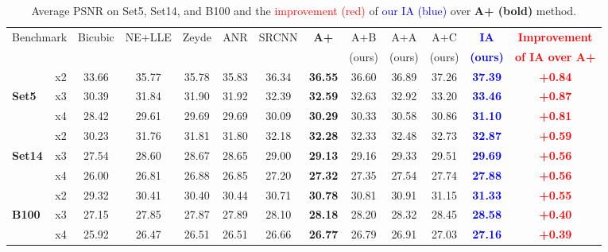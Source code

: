 \documentclass[10pt,twocolumn,letterpaper]{article}
\begin{document}
\begin{table}
\vspace{-0.2cm}
 \setlength{\tabcolsep}{4pt} 
\centering
\caption{Average PSNR on Set5, Set14, and B100 and the \textcolor{red}{improvement (red)} of \textcolor{blue}{our IA (blue)} over \textbf{A+ (bold)} method.
}
\vspace{0.01cm}
{
\begin{tabular}{lc||c c c c c c|c c c c|c}
\multicolumn{2}{c||}{Benchmark}&Bicubic&NE+LLE&Zeyde&ANR& SRCNN&\textbf{A+}&A+B&A+A&A+C&\textcolor{blue}{\bf IA}&\textcolor{red}{\bf Improvement}\\
\multicolumn{2}{c||}{ } &&\cite{Timofte-ICCV-2013}&\cite{Zeyde-CS-2012}&\cite{Timofte-ICCV-2013}& \cite{Dong-ECCV-2014}&\cite{Timofte-ACCV-2014}&(ours)&(ours)&(ours) &\textcolor{blue}{\bf (ours)}&\textcolor{red}{\bf of IA over A+}\\
\hline\hline
              & x2 & 33.66 & 35.77 & 35.78 & 35.83 & 36.34 &\textbf{36.55}&36.60&36.89&37.26&\textcolor{blue}{\bf 37.39}&\textcolor{red}{\bf +0.84}\\
\textbf{Set5 }& x3 & 30.39 & 31.84 & 31.90 & 31.92 & 32.39 &\textbf{32.59}&32.63&32.92&33.20&\textcolor{blue}{\bf 33.46}&\textcolor{red}{\bf+0.87}\\
              & x4 & 28.42 & 29.61 & 29.69 & 29.69 & 30.09 &\textbf{30.29}&30.33&30.58&30.86&\textcolor{blue}{\bf 31.10}&\textcolor{red}{\bf+0.81}\\
\hline
              & x2 & 30.23 & 31.76 & 31.81 & 31.80 & 32.18 &\textbf{32.28}&32.33&32.48&32.73&\textcolor{blue}{\bf 32.87}&\textcolor{red}{\bf+0.59}\\
\textbf{Set14}& x3 & 27.54 & 28.60 & 28.67 & 28.65 & 29.00 &\textbf{29.13}&29.16&29.33&29.51&\textcolor{blue}{\bf 29.69}&\textcolor{red}{\bf+0.56}\\
              & x4 & 26.00 & 26.81 & 26.88 & 26.85 & 27.20 &\textbf{27.32}&27.35&27.54&27.74&\textcolor{blue}{\bf 27.88}&\textcolor{red}{\bf+0.56}\\
              
\hline

             & x2 & 29.32 & 30.41 & 30.40 & 30.44 & 30.71 &\textbf{30.78}&30.81&30.91&31.15&\textcolor{blue}{\bf 31.33}&\textcolor{red}{\bf+0.55}\\
\textbf{B100}& x3 & 27.15 & 27.85 & 27.87 & 27.89 & 28.10 &\textbf{28.18}&28.20&28.32&28.45&\textcolor{blue}{\bf 28.58}&\textcolor{red}{\bf+0.40}\\
             & x4 & 25.92 & 26.47 & 26.51 & 26.51 & 26.66 &\textbf{26.77}&26.79&26.91&27.03&\textcolor{blue}{\bf 27.16}&\textcolor{red}{\bf+0.39}\\

\end{tabular}
}
\label{tab:avg_results}
\vspace{-0.5cm}
\end{table}
\end{document}

